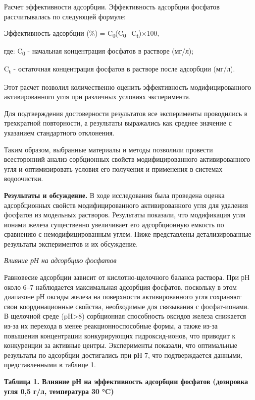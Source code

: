 Расчет эффективности адсорбции. Эффективность адсорбции фосфатов
рассчитывалась по следующей формуле:

Эффективность адсорбции (\%) =
C\textsubscript{0}(C\textsubscript{0}−C\textsubscript{t})×100,

где: C\textsubscript{0} - начальная концентрация фосфатов в растворе
(мг/л);

C\textsubscript{t} - остаточная концентрация фосфатов в растворе после
адсорбции (мг/л).

Этот расчет позволил количественно оценить эффективность
модифицированного активированного угля при различных условиях
эксперимента.

Для подтверждения достоверности результатов все эксперименты проводились
в трехкратной повторности, а результаты выражались как среднее значение
с указанием стандартного отклонения.

Таким образом, выбранные материалы и методы позволили провести
всесторонний анализ сорбционных свойств модифицированного
активированного угля и оптимизировать условия его получения и применения
в системах водоочистки.

{\bfseries Результаты и обсуждение.} В ходе исследования была проведена
оценка адсорбционных свойств модифицированного активированного угля для
удаления фосфатов из модельных растворов. Результаты показали, что
модификация угля ионами железа существенно увеличивает его адсорбционную
емкость по сравнению с немодифицированным углем. Ниже представлены
детализированные результаты экспериментов и их обсуждение.

\emph{Влияние рН на адсорбцию фосфатов}

Равновесие адсорбции зависит от кислотно-щелочного баланса раствора. При
рН около 6--7 наблюдается максимальная адсорбция фосфатов, поскольку в
этом диапазоне рН оксиды железа на поверхности активированного угля
сохраняют свои координационные свойства, необходимые для связывания с
фосфат-ионами. В щелочной среде (pH\textgreater8) сорбционная
способность оксидов железа снижается из-за их перехода в менее
реакционноспособные формы, а также из-за повышения концентрации
конкурирующих гидроксид-ионов, что приводит к конкуренции за активные
центры. Эксперименты показали, что оптимальные результаты по адсорбции
достигались при рН 7, что подтверждается данными, представленными в
таблице 1.

{\bfseries Таблица 1. Влияние рН на эффективность адсорбции фосфатов
(дозировка угля 0,5 г/л, температура 30 °C)}

